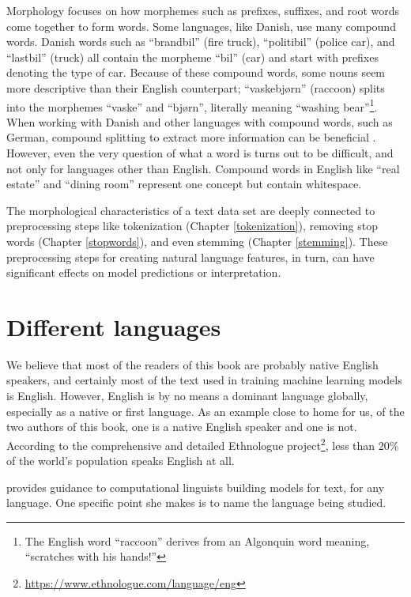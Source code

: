 \documentclass[
]{krantz}
\DeclareRobustCommand{\href}[2]{#2\footnote{\url{#1}}}
\renewcommand{\href}[2]{#2\footnote{\url{#1}}}
\begin{document}
Morphology focuses on how morphemes such as prefixes, suffixes, and root words come together to form words. Some languages, like Danish, use many compound words. Danish words such as ``brandbil'' (fire truck), ``politibil'' (police car), and ``lastbil'' (truck) all contain the morpheme ``bil'' (car) and start with prefixes denoting the type of car. Because of these compound words, some nouns seem more descriptive than their English counterpart; ``vaskebjørn'' (raccoon) splits into the morphemes ``vaske'' and ``bjørn'', literally meaning ``washing bear''\footnote{The English word ``raccoon'' derives from an Algonquin word meaning, ``scratches with his hands!''}. When working with Danish and other languages with compound words, such as German, compound splitting to extract more information can be beneficial \citep{Sugisaki2018}. However, even the very question of what a word is turns out to be difficult, and not only for languages other than English. Compound words in English like ``real estate'' and ``dining room'' represent one concept but contain whitespace.

The morphological characteristics of a text data set are deeply connected to preprocessing steps like tokenization (Chapter \ref{tokenization}), removing stop words (Chapter \ref{stopwords}), and even stemming (Chapter \ref{stemming}). These preprocessing steps for creating natural language features, in turn, can have significant effects on model predictions or interpretation.

\hypertarget{different-languages}{%
\section{Different languages}\label{different-languages}}

We believe that most of the readers of this book are probably native English speakers, and certainly most of the text used in training machine learning models is English. However, English is by no means a dominant language globally, especially as a native or first language. As an example close to home for us, of the two authors of this book, one is a native English speaker and one is not. According to the \href{https://www.ethnologue.com/language/eng}{comprehensive and detailed Ethnologue project}, less than 20\% of the world's population speaks English at all.

\citet{Bender11} provides guidance to computational linguists building models for text, for any language. One specific point she makes is to name the language being studied.
\end{document}
